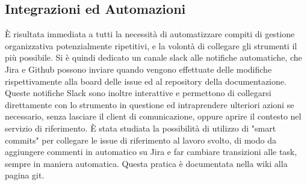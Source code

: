 \subsection{Integrazioni ed Automazioni}
È risultata immediata a tutti la necessità di automatizzare compiti di gestione organizzativa potenzialmente ripetitivi, e la volontà di collegare gli strumenti il più possibile. Si è quindi dedicato un canale slack alle notifiche automatiche, che Jira e Github possono inviare quando vengono effettuate delle modifiche rispettivamente alla board delle issue ed al repository della documentazione. Queste notifiche Slack sono inoltre interattive e permettono di collegarsi direttamente con lo strumento in questione ed intraprendere ulteriori azioni se necessario, senza lasciare il client di comunicazione, oppure aprire il contesto nel servizio di riferimento.
È stata studiata la possibilità di utilizzo di "smart commits" per collegare le issue di riferimento al lavoro svolto, di modo da aggiungere commenti in automatico su Jira e far cambiare transizioni alle task, sempre in maniera automatica. Questa pratica è documentata nella wiki alla pagina git.